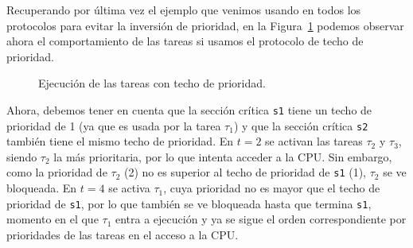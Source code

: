 \begin{ejemplo}
    Recuperando por última vez el ejemplo que venimos usando en todos los protocolos para evitar la inversión de prioridad, en la Figura~\ref{fig:techo_prio} podemos observar ahora el comportamiento de las tareas si usamos el protocolo de techo de prioridad.
    \begin{figure}[H]
        \centering
        \caption{Ejecución de las tareas con techo de prioridad.}
        \label{fig:techo_prio}
    \end{figure}
    Ahora, debemos tener en cuenta que la sección crítica \verb|s1| tiene un techo de prioridad de 1 (ya que es usada por la tarea $\tau_1$) y que la sección crítica \verb|s2| también tiene el mismo techo de prioridad. En $t=2$ se activan las tareas $\tau_2$ y $\tau_3$, siendo $\tau_2$ la más prioritaria, por lo que intenta acceder a la CPU. Sin embargo, como la prioridad de $\tau_2$ (2) no es superior al techo de prioridad de \verb|s1| (1), $\tau_2$ se ve bloqueada. En $t=4$ se activa $\tau_1$, cuya prioridad no es mayor que el techo de prioridad de \verb|s1|, por lo que también se ve bloqueada hasta que termina \verb|s1|, momento en el que $\tau_1$ entra a ejecución y ya se sigue el orden correspondiente por prioridades de las tareas en el acceso a la CPU\@.
\end{ejemplo}

